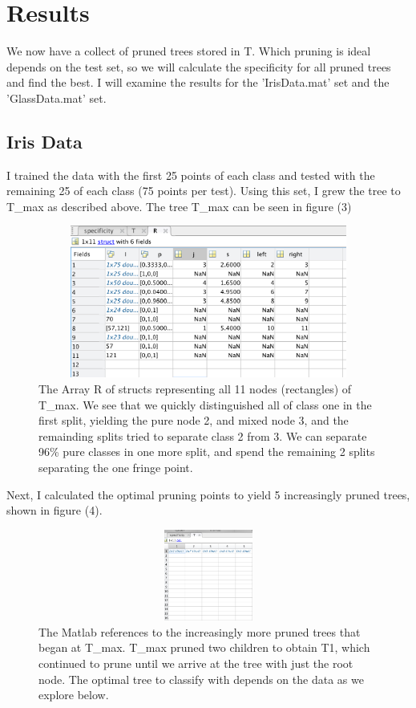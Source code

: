 \documentclass{article}
\begin{document}
\section*{Results}
We now have a collect of pruned trees stored in T.  Which pruning is ideal depends on the test set, so we will calculate the specificity for all pruned trees and find the best.   I will examine the results for the 'IrisData.mat' set and the 'GlassData.mat' set.  

\subsection*{Iris Data}
I trained the data with the first 25 points of each class and tested with the remaining 25 of each class (75 points per test).  Using this set, I grew the tree to T\_max as described above.  The tree T\_max can be seen in figure (3)
\begin{figure}[H]
    \centerline
    {\includegraphics[width=12cm, height=5cm]{IrisData_T_max.png}
    }
    \caption{\label{fig:my figure}The Array R of structs representing all 11 nodes (rectangles) of T\_max.  We see that we quickly distinguished all of class one in the first split, yielding the pure node 2, and mixed node 3, and the remainding splits tried to separate class 2 from 3.  We can separate 96\% pure classes in one more split, and spend the remaining 2 splits separating the one fringe point. }
\end{figure}

Next, I calculated the optimal pruning points to yield 5 increasingly pruned trees, shown in figure (4).  
\begin{figure}[H]
    \centerline
    {\includegraphics[width=12cm, height=3cm]{IrisData_T.png}
    }
    \caption{\label{fig:my figure} The Matlab references to the increasingly more pruned trees that began at T\_max.  T\_max pruned two children to obtain T{1}, which continued to prune until we arrive at the tree with just the root node.  The optimal tree to classify with depends on the data as we explore below.  }
\end{figure}
\end{document}
